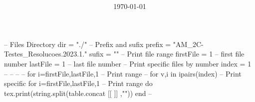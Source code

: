 \documentclass[
    class=article,
    multi={minipage},
    border={3mm},
]{standalone}
\title{\huge\bfseries\color{Emph}\mytitle}
\author{\Large\myauthor}
\date{\Large\today}
\begin{document}
\mymaketitle
\begin{luacode*}
    -- Files Directory
    dir = "./"
    -- Prefix and sufix
    prefix = "AM_2C-Testes_Resolucoes.2023.1."
    sufix  = ""
    -- Print file range
    firstFile = 1 -- first file number
    lastFile  = 1 -- last  file number
    -- Print specific files by number
    index = {1}
    -- %
    -- %
    -- %
    -- for i=firstFile,lastFile,1 -- Print range
    -- for v,i in ipairs(index)   -- Print specific
    for i=firstFile,lastFile,1 -- Print range
    do
        tex.print(string.split(table.concat{
        [[
            \newpage
        ]]
        },"\n"))
    end
    -- %
\end{luacode*}
\end{document}
